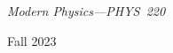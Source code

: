 {\LARGE {\em 
\noindent Modern Physics---PHYS~220
\vspace{0.5mm}

\noindent Fall 2023
\vspace{3mm}
}}

